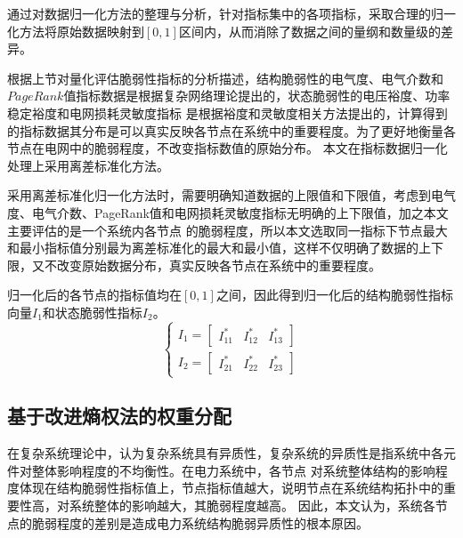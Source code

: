 通过对数据归一化方法的整理与分析，针对指标集中的各项指标，采取合理的归一化方法将原始数据映射到$\left[0,1\right]$区间内，从而消除了数据之间的量纲和数量级的差异。

根据上节对量化评估脆弱性指标的分析描述，结构脆弱性的电气度、电气介数和$PageRank$值指标数据是根据复杂网络理论提出的，状态脆弱性的电压裕度、功率稳定裕度和电网损耗灵敏度指标
是根据裕度和灵敏度相关方法提出的，计算得到的指标数据其分布是可以真实反映各节点在系统中的重要程度。为了更好地衡量各节点在电网中的脆弱程度，不改变指标数值的原始分布。
本文在指标数据归一化处理上采用离差标准化方法。

采用离差标准化归一化方法时，需要明确知道数据的上限值和下限值，考虑到电气度、电气介数、PageRank值和电网损耗灵敏度指标无明确的上下限值，加之本文主要评估的是一个系统内各节点
的脆弱程度，所以本文选取同一指标下节点最大和最小指标值分别最为离差标准化的最大和最小值，这样不仅明确了数据的上下限，又不改变原始数据分布，真实反映各节点在系统中的重要程度。

归一化后的各节点的指标值均在$\left[0,1\right]$之间，因此得到归一化后的结构脆弱性指标向量$I_1$和状态脆弱性指标$I_2$。
\begin{equation}
  \left\{\begin{array}{l}{I_{1}=\left[\begin{array}{lll}{I_{11}^{*}} & {I_{12}^{*}} & {I_{13}^{*}}\end{array}\right]} \\
   {I_{2}=\left[\begin{array}{lll}{I_{21}^{*}} & {I_{22}^{*}} & {I_{23}^{*}}\end{array}\right]}\end{array}\right.
  \end{equation}

  
\subsection{基于改进熵权法的权重分配}
\label{sec:nomalz}
在复杂系统理论中，认为复杂系统具有异质性，复杂系统的异质性是指系统中各元件对整体影响程度的不均衡性。在电力系统中，各节点
对系统整体结构的影响程度体现在结构脆弱性指标值上，节点指标值越大，说明节点在系统结构拓扑中的重要性高，对系统整体的影响越大，其脆弱程度越高。
因此，本文认为，系统各节点的脆弱程度的差别是造成电力系统结构脆弱异质性的根本原因。


